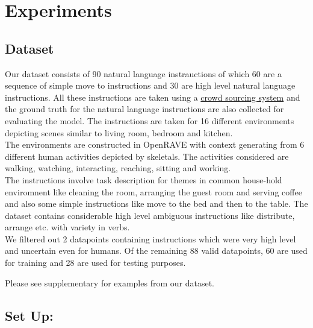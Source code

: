 \section{Experiments}
\subsection{Dataset}
Our dataset consists of 90 natural language instrauctions of which 60 are a sequence of simple move to instructions and 30 are high level natural language instructions. All these instructions are taken using a \href{http://52.25.65.189:9000/#/getFeedback}{crowd sourcing system} and the ground truth for the natural language instructions are also collected for evaluating the model. The instructions are taken for 16 different environments depicting scenes similar to living room, bedroom and kitchen. \\
The environments are constructed in OpenRAVE with context generating from 6 different human activities depicted by skeletals. The activities considered are walking, watching, interacting, reaching, sitting and working. \\
The instructions involve task description for themes in common house-hold enviromnent like cleaning the room, arranging the guest room and serving coffee and also some simple instructions like move to the bed and then to the table. The dataset contains considerable high level ambiguous instructions like distribute, arrange etc. with variety in verbs.\\
We filtered out 2 datapoints containing instructions which were very high level and uncertain even for  humans. Of the remaining 88 valid datapoints, 60 are used for training and 28 are used for testing purposes.  

Please see supplementary for examples from our dataset.

\subsection{Set Up:}
